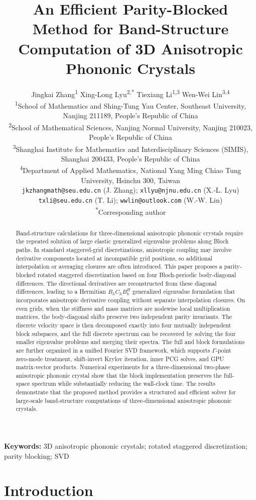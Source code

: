 \documentclass[11pt,oneside]{article}
\title{\bfseries An Efficient Parity-Blocked Method for Band-Structure Computation of 3D Anisotropic Phononic Crystals}
\author{%
\parbox{0.96\textwidth}{\centering
Jingkai Zhang\textsuperscript{1}\quad
Xing-Long Lyu\textsuperscript{2,*}\quad
Tiexiang Li\textsuperscript{1,3}\quad
Wen-Wei Lin\textsuperscript{3,4}\\[0.55em]
\footnotesize
\textsuperscript{1}School of Mathematics and Shing-Tung Yau Center, Southeast University,\\
Nanjing 211189, People's Republic of China\\
\textsuperscript{2}School of Mathematical Sciences, Nanjing Normal University, Nanjing 210023, People's Republic of China\\
\textsuperscript{3}Shanghai Institute for Mathematics and Interdisciplinary Sciences (SIMIS),\\
Shanghai 200433, People's Republic of China\\
\textsuperscript{4}Department of Applied Mathematics, National Yang Ming Chiao Tung University, Hsinchu 300, Taiwan\\[0.55em]
\texttt{jkzhangmath@seu.edu.cn} (J. Zhang); \texttt{xllyu@njnu.edu.cn} (X.-L. Lyu)\\
\texttt{txli@seu.edu.cn} (T. Li); \texttt{wwlin@outlook.com} (W.-W. Lin)\\[0.25em]
\textsuperscript{*}Corresponding author
}}
\date{}
\numberwithin{equation}{section}
\theoremstyle{plain}
\theoremstyle{remark}
\begin{document}
\maketitle

\begin{abstract}
Band-structure calculations for three-dimensional anisotropic phononic crystals require the repeated solution of large elastic generalized eigenvalue problems along Bloch paths. In standard staggered-grid discretizations, anisotropic coupling may involve derivative components located at incompatible grid positions, so additional interpolation or averaging closures are often introduced. This paper proposes a parity-blocked rotated staggered discretization based on four Bloch-periodic body-diagonal differences. The directional derivatives are reconstructed from these diagonal differences, leading to a Hermitian $B_hC_hB_h^H$ generalized eigenvalue formulation that incorporates anisotropic derivative coupling without separate interpolation closures. On even grids, when the stiffness and mass matrices are nodewise local multiplication matrices, the body-diagonal shifts preserve two independent parity invariants. The discrete velocity space is then decomposed exactly into four mutually independent block subspaces, and the full discrete spectrum can be recovered by solving the four smaller eigenvalue problems and merging their spectra. The full and block formulations are further organized in a unified Fourier SVD framework, which supports $\Gamma$-point zero-mode treatment, shift-invert Krylov iteration, inner PCG solves, and GPU matrix-vector products. Numerical experiments for a three-dimensional two-phase anisotropic phononic crystal show that the block implementation preserves the full-space spectrum while substantially reducing the wall-clock time. The results demonstrate that the proposed method provides a structured and efficient solver for large-scale band-structure computations of three-dimensional anisotropic phononic crystals.
\end{abstract}


\noindent\textbf{Keywords:} 3D anisotropic phononic crystals; rotated staggered discretization; parity blocking; SVD


\bigskip

\section{Introduction}
\label{sec1}
\end{document}
